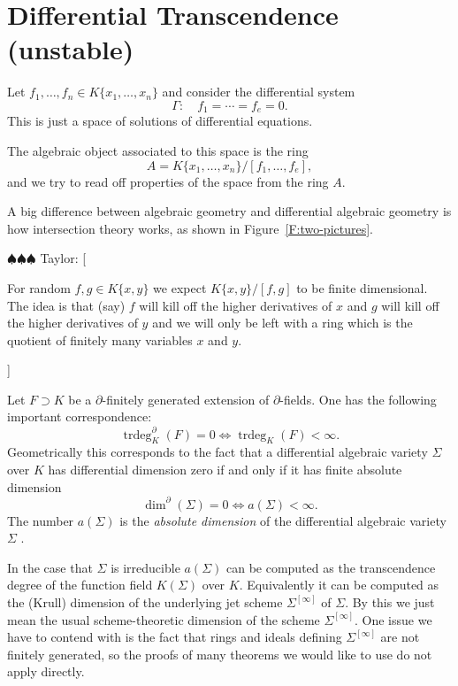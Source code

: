 \documentclass[12pt]{book}
\newcommand{\taylor}[1]{{\color{blue} \sf $\spadesuit\spadesuit\spadesuit$ Taylor: [#1]}}
\numberwithin{equation}{section}
\theoremstyle{definition}
\theoremstyle{remark}
\newcommand{\trdeg}{\operatorname{trdeg}}
\begin{document}
\section{Differential Transcendence (unstable)}
Let $f_1,\ldots,f_n \in K\lbrace x_1,\ldots,x_n\rbrace$ and consider the differential system 
 $$ \Gamma \colon \quad f_1=\cdots = f_e =0.$$
This is just a space of solutions of differential equations. 

The algebraic object associated to this space is the ring 
 $$ A=K\lbrace x_1,\ldots, x_n\rbrace/[f_1,\ldots,f_e],$$
and we try to read off properties of the space from the ring $A$.



A big difference between algebraic geometry and differential algebraic geometry is how intersection theory works, as shown in Figure~\ref{F:two-pictures}.

\taylor{

For random $f,g \in K\lbrace x,y \rbrace$ we expect $K\lbrace x,y\rbrace/[f,g]$ to be finite dimensional. 
The idea is that (say) $f$ will kill off the higher derivatives of $x$ and $g$ will kill off the higher derivatives of $y$ and we will only be left with a ring which is the quotient of finitely many variables $x$ and $y$.

}



Let $F\supset K$ be a $\partial$-finitely generated extension of $\partial$-fields.
One has the following important correspondence:
$$ \trdeg_K^{\partial}(F)=0 \iff \trdeg_K(F)<\infty. $$
Geometrically this corresponds to the fact that a differential algebraic variety $\Sigma$ over $K$ has differential dimension zero if and only if it has finite absolute dimension
$$\dim^{\partial}(\Sigma)=0 \iff a(\Sigma)<\infty.$$ 
The number $a(\Sigma)$ is the \emph{absolute dimension} of the differential algebraic variety $\Sigma$ \cite[\S 2, pg 485]{Buium1993}. 

In the case that $\Sigma$ is irreducible $a(\Sigma)$ can be computed as the transcendence degree of the function field $K(\Sigma)$ over $K$.
Equivalently it can be computed as the (Krull) dimension of the underlying jet scheme $\Sigma^{[\infty]}$ of $\Sigma$.
By this we just mean the usual scheme-theoretic dimension of the scheme $\Sigma^{[\infty]}$. 
One issue we have to contend with is the fact that rings and ideals defining $\Sigma^{[\infty]}$ are not finitely generated, so the proofs of many theorems we would like to use do not apply directly.
\end{document}
